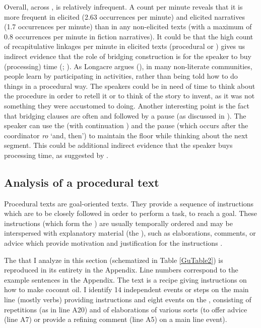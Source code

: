\documentclass[output=paper]{LSP/langsci}
\begin{document}
Overall, across ,  is relatively infrequent. A count per minute reveals that it is more frequent in elicited  (2.63 occurrences per minute) and elicited narratives (1.7 occurrences per minute) than in any non-elicited texts (with a maximum of 0.8 occurrences per minute in fiction narratives). It could be that the high count of recapitulative linkages per minute in elicited texts (procedural or ) gives us indirect evidence that the role of bridging construction is for the speaker to buy (processing) time (\citealt[][378]{devries.2005}; \citeyear[][817]{devries.2006}). As Longacre argues (\citeyear[][9--10]{longacre83}), in many non-literate communities, people learn by participating in activities, rather than being told how to do things in a procedural way. The speakers could be in need of time to think about the procedure in order to retell it or to think of the story to invent, as it was not something they were accustomed to doing. Another interesting point is the fact that bridging clauses are often  and followed by a pause (as discussed in ). The speaker can use the  (with continuation ) and the pause (which occurs after the coordinator \textit{ro} `and, then') to maintain the floor while thinking about the next segment. This could be additional indirect evidence that the speaker buys processing time, as suggested by \citet[][817]{devries.2006}. 


\subsection{Analysis of a procedural text} 
\label{Gusec:procedural}
Procedural texts are goal-oriented texts. They provide a sequence of instructions which are to be closely followed in order to perform a task, to reach a goal. These instructions (which form the ) are usually temporally ordered and may be interspersed with explanatory material (the ), such as elaborations, comments, or advice which provide motivation and justification for the instructions \citep{adam01,fontan08,delpech08}. 

The  that I analyze in this section (schematized in Table \ref{GuTable2}) is reproduced in its entirety in the Appendix. Line numbers correspond to the example sentences in the Appendix. The text is a recipe giving instructions on how to make coconut oil. I identify 14 independent events or steps on the main line (mostly  verbs) providing instructions and eight events on the , consisting of repetitions (as in line A20) and of elaborations of various sorts (to offer advice (line A7) or provide a refining comment (line A5) on a main line event). 
\end{document}
